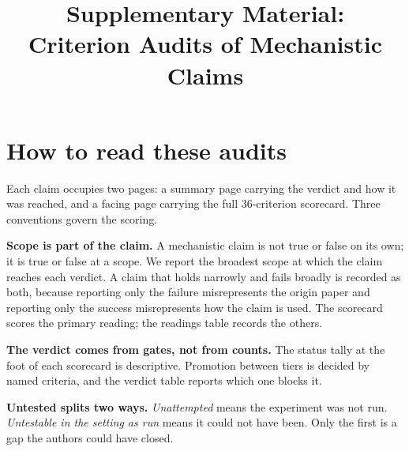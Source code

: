 \documentclass{article}
\title{Supplementary Material:\\Criterion Audits of Mechanistic Claims}
\author{}
\begin{document}
\maketitle

\section*{How to read these audits}

Each claim occupies two pages: a summary page carrying the verdict and how it was reached,
and a facing page carrying the full 36-criterion scorecard. Three conventions govern the
scoring.

\textbf{Scope is part of the claim.} A mechanistic claim is not true or false on its own;
it is true or false at a scope. We report the broadest scope at which the claim reaches
each verdict. A claim that holds narrowly and fails broadly is recorded as both, because
reporting only the failure misrepresents the origin paper and reporting only the success
misrepresents how the claim is used. The scorecard scores the primary reading; the readings table records the others.

\textbf{The verdict comes from gates, not from counts.} The status tally at the foot of
each scorecard is descriptive. Promotion between tiers is decided by named criteria, and
the verdict table reports which one blocks it.

\textbf{Untested splits two ways.} \emph{Unattempted} means the experiment was not run.
\emph{Untestable in the setting as run} means it could not have been. Only the first is a
gap the authors could have closed.

















\end{document}
